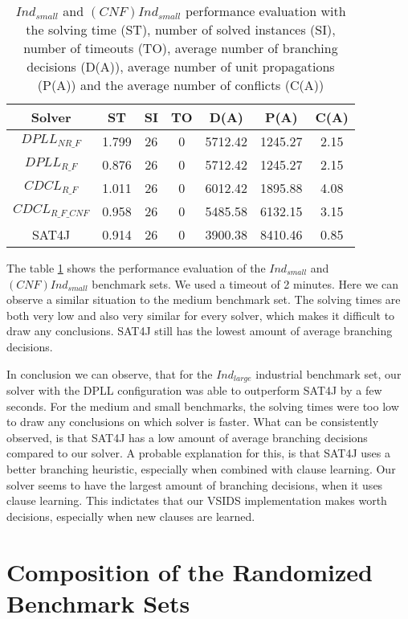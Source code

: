 \begin{table}[!htb]
\centering
\caption[$Ind_{small}$ and $(CNF)Ind_{small}$ performance evaluation]{$Ind_{small}$ and $(CNF)Ind_{small}$ performance evaluation with the solving time (ST), number of solved instances (SI), number of timeouts (TO), average number of branching decisions (D(A)), average number of unit propagations (P(A)) and the average number of conflicts (C(A))}
\label{tab:wBenchmarks}
\begin{tabular}{|c|c|c|c|c|c|c|}
\hline
Solver & ST & SI & TO & D(A) & P(A) & C(A)\\ 
\hline
$DPLL_{NR\_F}$ & 1.799 & 26 & 0 & 5712.42 & 1245.27 & 2.15 \\ 
\hline
$DPLL_{R\_F}$ & 0.876 & 26 & 0 & 5712.42 & 1245.27 & 2.15 \\ 
\hline
$CDCL_{R\_F}$ & 1.011 & 26 & 0 & 6012.42 & 1895.88 & 4.08 \\ 
\hline
$CDCL_{R\_F\_CNF}$ & 0.958 & 26 & 0 & 5485.58 & 6132.15 & 3.15 \\ 
\hline
SAT4J & 0.914 & 26 & 0 & 3900.38 & 8410.46 & 0.85 \\ 
\hline
\end{tabular}
\end{table}

The table \ref{tab:wBenchmarks} shows the performance evaluation of the $Ind_{small}$ and  $(CNF)Ind_{small}$ benchmark sets. We used a timeout of 2 minutes. Here we can observe a similar situation to the medium benchmark set. The solving times are both very low and also very similar for every solver, which makes it difficult to draw any conclusions. SAT4J still has the lowest amount of average branching decisions.

In conclusion we can observe, that for the $Ind_{large}$ industrial benchmark set, our solver with the DPLL configuration was able to outperform SAT4J by a few seconds. For the medium and small benchmarks, the solving times were too low to draw any conclusions on which solver is faster. What can be consistently observed, is that SAT4J has a low amount of average branching decisions compared to our solver. A probable explanation for this, is that SAT4J uses a better branching heuristic, especially when combined with clause learning. Our solver seems to have the largest amount of branching decisions, when it uses clause learning. This indictates that our VSIDS implementation makes worth decisions, especially when new clauses are learned.

\section{Composition of the Randomized Benchmark Sets}

